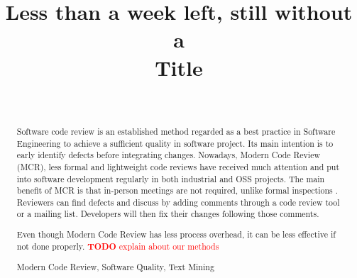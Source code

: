 \documentclass[conference]{IEEEtran}
\begin{document}
\title{ {\Large Less than a week left, still without a}\\ Title}

\author{
\\


}


\maketitle
{}
{\newcommand{\nbnote}[2]{
  \fcolorbox{blue}{yellow}{\bfseries\sffamily\scriptsize#1}
  {\sf\small\textit{#2}}
 }
}
{\newcommand{\nbnote}[2]{}
 \newcommand{\version}{}
}
\newcommand\pick[1]{\nbnote{Pick sez}{\textcolor{magenta}{#1}}}
\newcommand\thai[1]{\nbnote{Thai sez}{\textcolor{blue}{#1}}}
\newcommand\TODO[1]{\textcolor{red}{\textbf{TODO} #1}}


\begin{abstract}
Software code review is an established method regarded as a best practice in Software Engineering to achieve a sufficient quality in software project.
Its main intention is to early identify defects before integrating changes.
Nowadays, Modern Code Review (MCR)\cite{Bacchelli2013a}, less formal and lightweight code reviews have received much attention and put into software development regularly in both industrial and OSS projects.
The main benefit of MCR is that in-person meetings are not required, unlike formal inspections \cite{Fagan:1976:DCI:1661010.1661012}.
Reviewers can find defects and discuss by adding comments through a code review tool or a mailing list.
Developers will then fix their changes following those comments.

Even though Modern Code Review has less process overhead, it can be less effective if not done properly.
\TODO{explain about our methods}



\begin{IEEEkeywords}
Modern Code Review, Software Quality, Text Mining
\end{IEEEkeywords}
\end{abstract}
\end{document}
